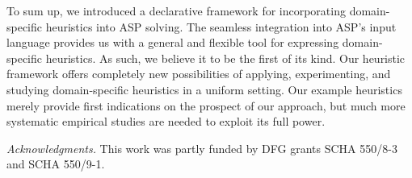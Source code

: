 \documentclass[letterpaper]{article}
\begin{document}
To sum up,
we introduced a declarative framework for incorporating domain-specific heuristics into ASP solving.
The seamless integration into ASP's input language provides us with a general and flexible tool for
expressing domain-specific heuristics.
As such, we believe it to be the first of its kind.
Our heuristic framework offers completely new possibilities of applying, experimenting, and studying
domain-specific heuristics in a uniform setting.
Our example heuristics merely provide first indications on the prospect of our approach,
but much more systematic empirical studies are needed to exploit its full power.




\smallskip\noindent\emph{Acknowledgments.}
%
This work was partly funded 
by 
DFG grants 
SCHA 550/8-3 %
and
SCHA 550/9-1.   %

\end{document}
